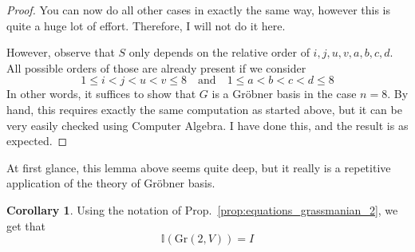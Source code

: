 \documentclass{scrartcl}
\newcommand{\I}{\mathbb{I}}
\newcommand{\Gr}{\mathrm{Gr}}
\theoremstyle{definition}
\newtheorem{corollary}[subsection]{Corollary}
\begin{document}
\begin{proof}
    You can now do all other cases in exactly the same way, however this is quite a huge lot of effort.
    Therefore, I will not do it here.

    However, observe that $S$ only depends on the relative order of $i, j, u, v, a, b, c, d$.
    All possible orders of those are already present if we consider
    \begin{equation*}
        1 \leq i < j < u < v \leq 8 \quad \text{and} \quad 1 \leq a < b < c < d \leq 8
    \end{equation*}
    In other words, it suffices to show that $G$ is a Gröbner basis in the case $n = 8$.
    By hand, this requires exactly the same computation as started above, but it can be very easily checked using Computer Algebra.
    I have done this, and the result is as expected.
\end{proof}
At first glance, this lemma above seems quite deep, but it really is a repetitive application of the theory of Gröbner basis.
\begin{corollary}
    Using the notation of Prop.~\ref{prop:equations_grassmanian_2}, we get that
    \begin{equation*}
        \I(\Gr(2, V)) = I
    \end{equation*}
\end{corollary}
\end{document}
